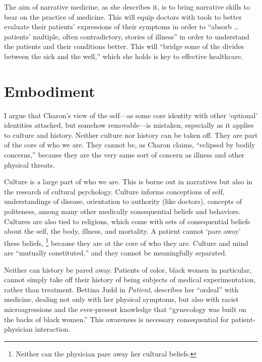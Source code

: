\documentclass[12pt]{article}
\begin{document}
The aim of narrative medicine, as she describes it, is to bring narrative
skills to bear on the practice of medicine. This will equip doctors with tools
to better evaluate their patients' expressions of their symptoms in order to
``absorb \dots{} patients' multiple, often contradictory, stories of
illness''\autocite[p.~4]{Charon06} in order to understand the patients and
their conditions better. This will ``bridge some of the divides between the
sick and the well,''\autocite[p.~12]{Charon06} which she holds is key to
effective healthcare.

\section{Embodiment}

I argue that Charon's view of the self---as some core identity with other
`optional' identities attached, but somehow removable---is mistaken, especially
as it applies to culture and history.
Neither culture nor history can be taken off. They are part of the core of who we are.
They cannot be, as Charon claims, ``eclipsed by bodily concerns,'' because they
are the very same sort of concern as illness and other physical threats.

Culture is a large part of who we are. This is borne out in narratives but also
in the research of cultural psychology. Culture informs conceptions of
self,\autocite{Markus10} understandings of disease,\autocite{Fadiman97}
orientation to authority (like doctors)\autocite{Tyler00}, concepts of
politeness,\autocite{Yin09} among many other medically consequential beliefs
and behaviors. Cultures are also tied to religions, which come with sets of
consequential beliefs about the self, the body, illness, and mortality. A 
patient cannot `pare away' these beliefs,%
	\footnote{Neither can the physician pare away her cultural beliefs.}
because they are at the core of who they are. Culture and mind are ``mutually
constituted,''\autocite[p.~1423]{Heine10} and they cannot be meaningfully
separated.

Neither can history be pared away. Patients of color, black women in
particular, cannot simply take off their history of being subjects of medical
experimentation, rather than treatment. Bettina Judd in
\emph{Patient},\autocite{Judd14} describes her ``ordeal'' with medicine, 
dealing not only with her physical symptoms, but also with racist
microagressions and the ever-present knowledge that ``gynecology was built on
the backs of black women.''\autocite{Judd15} This awareness is necessary
consequential for patient-physician interaction.
\end{document}
